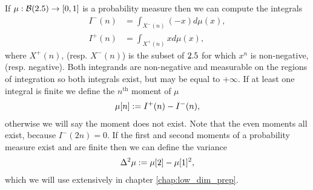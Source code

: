 If $\mu:\mathcal{B}(2.5)\to [0,1]$ is a probability measure then we can compute the integrals
\begin{align}
  I^-(n) &= \int_{X^{-}(n)} (-x) d\mu(x),\\
  I^+(n) &= \int_{X^{+}(n)} x d\mu(x),
\end{align}
where $X^{+}(n)$, (resp. $X^{-}(n)$) is the subset of $2.5$ for which $x^n$ is non-negative, (resp. negative). Both integrands are non-negative and measurable on the regions of integration so both integrals exist, but may be equal to $+\infty$. If at least one integral is finite we define the $n^\text{th}$ moment of $\mu$
\begin{align}
  \mu[n] := I^+(n) - I^-(n),
\end{align}
otherwise we will say the moment does not exist. Note that the even moments all exist, because $I^-(2n) = 0$. If the first and second moments of a probability measure exist and are finite then we can define the variance
\begin{align}
  \var{\mu} \defeq \mu[2] - \mu[1]^2, \label{eqn:prelim-def-variance}
\end{align}
which we will use extensively in chapter \ref{chap:low_dim_prep}.

